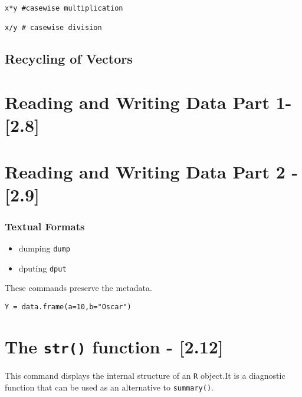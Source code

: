 \begin{framed}
\begin{verbatim}
x*y #casewise multiplication

x/y # casewise division
\end{verbatim}
\end{framed}

\subsection*{Recycling of Vectors}

\newpage
\section*{Reading and Writing Data Part 1- [2.8]}

\section*{Reading and Writing Data Part 2 - [2.9]}

\subsubsection{Textual Formats}

\begin{itemize}
\item dumping \texttt{dump} 
\item dputing \texttt{dput}
\end{itemize}

These commands preserve the metadata.

\begin{framed}
\begin{verbatim}
Y = data.frame(a=10,b="Oscar")

\end{verbatim}
\end{framed}

\section*{The \texttt{str()} function - [2.12]}


This command displays the internal structure of an \texttt{R} object.It is a diagnostic function that can be used as an alternative to \texttt{summary()}.

